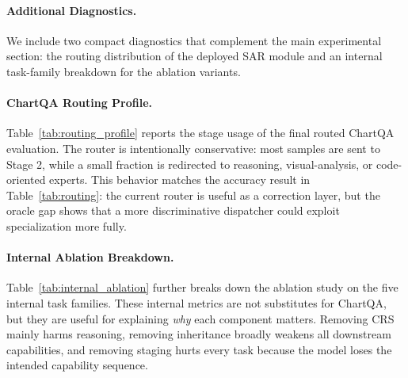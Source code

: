 \documentclass[journal]{IEEEtran}
\newcommand{\crs}{CRS}
\newcommand{\sar}{SAR}
\begin{document}
\paragraph{Additional Diagnostics.}
We include two compact diagnostics that complement the main experimental section: the routing distribution of the deployed \sar{} module and an internal task-family breakdown for the ablation variants.

\paragraph{ChartQA Routing Profile.}
Table~\ref{tab:routing_profile} reports the stage usage of the final routed ChartQA evaluation.
The router is intentionally conservative: most samples are sent to Stage 2, while a small fraction is redirected to reasoning, visual-analysis, or code-oriented experts.
This behavior matches the accuracy result in Table~\ref{tab:routing}: the current router is useful as a correction layer, but the oracle gap shows that a more discriminative dispatcher could exploit specialization more fully.

\begin{table}[!t]
\centering
\footnotesize
{}
\vspace{4pt}
\caption{Predicted stage usage for the final ChartQA routed evaluation.}
\label{tab:routing_profile}
\end{table}

\paragraph{Internal Ablation Breakdown.}
Table~\ref{tab:internal_ablation} further breaks down the ablation study on the five internal task families.
These internal metrics are not substitutes for ChartQA, but they are useful for explaining \emph{why} each component matters.
Removing \crs{} mainly harms reasoning, removing inheritance broadly weakens all downstream capabilities, and removing staging hurts every task because the model loses the intended capability sequence.
\end{document}
